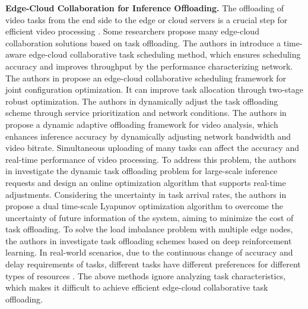 \par
\textbf{Edge-Cloud Collaboration for Inference Offloading.} The offloading of video tasks from the end side to the edge or cloud servers is a crucial step for efficient video processing \cite{grulich2018collaborative383838}. Some researchers propose many edge-cloud collaboration solutions based on task offloading. The authors in \cite{liu2022sniper888} introduce a time-aware edge-cloud collaborative task scheduling method, which ensures scheduling accuracy and improves throughput by the performance characterizing network. The authors in \cite{yangadaptive262626} propose an edge-cloud collaborative scheduling framework for joint configuration optimization. It can improve task allocation through two-stage robust optimization. The authors in \cite{nigade2022jellyfish272727} dynamically adjust the task offloading scheme through service prioritization and network conditions. The authors in \cite{murad2022dao999} propose a dynamic adaptive offloading framework for video analysis, which enhances inference accuracy by dynamically adjusting network bandwidth and video bitrate. Simultaneous uploading of many tasks can affect the accuracy and real-time performance of video processing. To address this problem, the authors in \cite{xu2020energy101010} investigate the dynamic task offloading problem for large-scale inference requests and design an online optimization algorithm that supports real-time adjustments. Considering the uncertainty in task arrival rates, the authors in \cite{111111} propose a dual time-scale Lyapunov optimization algorithm to overcome the uncertainty of future information of the system, aiming to minimize the cost of task offloading. To solve the load imbalance problem with multiple edge nodes, the authors in \cite{tang2020deep282828,qu2021dmro292929} investigate task offloading schemes based on deep reinforcement learning. In real-world scenarios, due to the continuous change of accuracy and delay requirements of tasks, different tasks have different preferences for different types of resources \cite{kumar2015preference393939}. The above methods ignore analyzing task characteristics, which makes it difficult to achieve efficient edge-cloud collaborative task offloading.